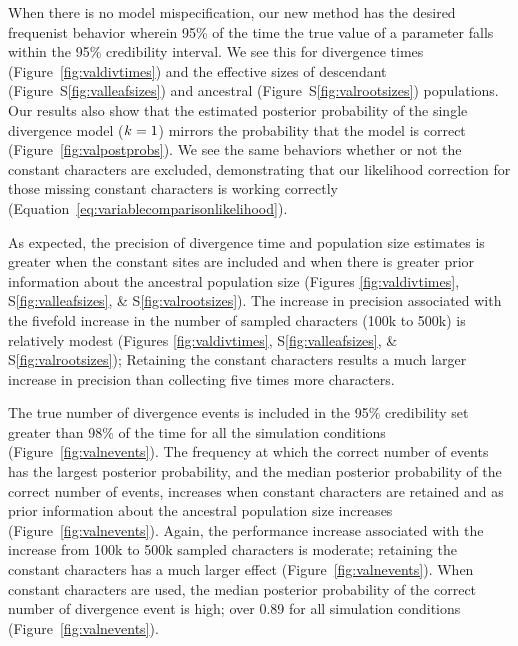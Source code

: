 When there is no model mispecification, our new method has the desired
frequenist behavior wherein 95\% of the time the true value of a parameter
falls within the 95\% credibility interval.
We see this for
divergence times
(Figure~\ref{fig:valdivtimes})
and the effective sizes of
descendant
(Figure~S\ref{fig:valleafsizes})
and ancestral
(Figure~S\ref{fig:valrootsizes})
populations.
Our results also show that the estimated posterior probability of the single
divergence model ($k_{}{} = 1$) mirrors the probability that the model
is correct 
(Figure~\ref{fig:valpostprobs}).
We see the same behaviors whether or not the constant characters are excluded,
demonstrating that our likelihood correction for those missing constant
characters is working correctly
(Equation~\ref{eq:variablecomparisonlikelihood}).

As expected, the precision of divergence time and population size estimates is
greater when the constant sites are included and when there is greater prior
information about the ancestral population size
(Figures \ref{fig:valdivtimes}, S\ref{fig:valleafsizes}, \&
S\ref{fig:valrootsizes}).
The increase in precision associated with the fivefold increase in the number
of sampled characters (100k to 500k) is relatively modest (Figures
\ref{fig:valdivtimes}, S\ref{fig:valleafsizes}, \& S\ref{fig:valrootsizes});
Retaining the constant characters results a much larger increase in precision
than collecting five times more characters.

The true number of divergence events is included in the 95\% credibility set
greater than 98\% of the time for all the simulation conditions
(Figure~\ref{fig:valnevents}).
The frequency at which the correct number of events has the largest posterior
probability, and the median posterior probability of the correct number of
events,
increases when constant characters are retained and as prior information about
the ancestral population size increases 
(Figure~\ref{fig:valnevents}).
Again, the performance increase associated with the increase from 100k to 500k
sampled characters is moderate; retaining the constant characters
has a much larger effect
(Figure~\ref{fig:valnevents}).
When constant characters are used, the median posterior
probability of the correct number of divergence event is high; over 0.89
for all simulation conditions
(Figure~\ref{fig:valnevents}).

